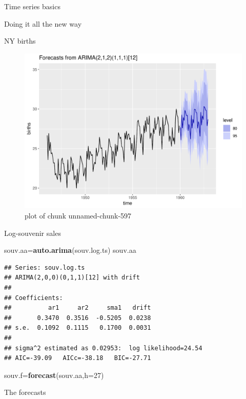 \documentclass[ignorenonframetext,]{beamer}
\newenvironment{Shaded}{\begin{snugshade}}{\end{snugshade}}
\newcommand{\DataTypeTok}[1]{\textcolor[rgb]{0.13,0.29,0.53}{#1}}
\newcommand{\DecValTok}[1]{\textcolor[rgb]{0.00,0.00,0.81}{#1}}
\newcommand{\KeywordTok}[1]{\textcolor[rgb]{0.13,0.29,0.53}{\textbf{#1}}}
\newcommand{\NormalTok}[1]{#1}
\begin{document}
\begin{frame}[fragile]{Time series basics}
\begin{block}{Doing it all the new way}
\begin{block}{NY births}
\begin{figure}
\centering
\includegraphics{figure/unnamed-chunk-597-1.pdf}
\caption{plot of chunk unnamed-chunk-597}
\end{figure}

\end{block}

\begin{block}{Log-souvenir sales}

\begin{Shaded}
\begin{Highlighting}[]
\NormalTok{souv.aa=}\KeywordTok{auto.arima}\NormalTok{(souv.log.ts)}
\NormalTok{souv.aa}
\end{Highlighting}
\end{Shaded}

\begin{verbatim}
## Series: souv.log.ts 
## ARIMA(2,0,0)(0,1,1)[12] with drift 
## 
## Coefficients:
##          ar1     ar2     sma1   drift
##       0.3470  0.3516  -0.5205  0.0238
## s.e.  0.1092  0.1115   0.1700  0.0031
## 
## sigma^2 estimated as 0.02953:  log likelihood=24.54
## AIC=-39.09   AICc=-38.18   BIC=-27.71
\end{verbatim}

\begin{Shaded}
\begin{Highlighting}[]
\NormalTok{souv.f=}\KeywordTok{forecast}\NormalTok{(souv.aa,}\DataTypeTok{h=}\DecValTok{27}\NormalTok{)}
\end{Highlighting}
\end{Shaded}

The forecasts


\end{block}
\end{block}
\end{frame}
\end{document}
